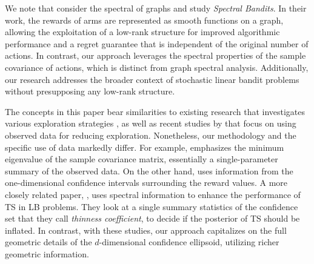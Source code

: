


 

We note that \cite{valko2014spectral, kocak2014Spectral, kocak2020spectral, kocak2020Best} consider the spectral of graphs and study \emph{Spectral Bandits}. In their work, the rewards of arms are represented as smooth functions on a graph, allowing the exploitation of a low-rank structure for improved algorithmic performance and a regret guarantee that is independent of the original number of actions. In contrast, our approach leverages the spectral properties of the sample covariance of actions, which is distinct from graph spectral analysis. Additionally, our research addresses the broader context of stochastic linear bandit problems without presupposing any low-rank structure.


The concepts in this paper bear similarities to existing research that investigates various exploration strategies \citep{russo2016information, kirschner2018heteroscedastic}, as well as recent studies by \citep{bastani2021mostly, pacchiano2020regret, hamidi2020frequentist, hamidi2020general} that focus on using observed data for reducing exploration. Nonetheless, our methodology and the specific use of data markedly differ. For example, \cite{bastani2021mostly} emphasizes the minimum eigenvalue of the sample covariance matrix, essentially a single-parameter summary of the observed data. On the other hand, \cite{hamidi2020general} uses information from the one-dimensional confidence intervals surrounding the reward values.  A more closely related paper,  \cite{hamidi2020frequentist}, uses spectral information to enhance the performance of TS in LB problems. They look at a single summary statistics of the confidence set that they call \emph{thinness coefficient}, to decide if the posterior of TS should be inflated.  In contrast, with these studies, our approach capitalizes on the full geometric details of the $d$-dimensional confidence ellipsoid, utilizing richer geometric information.

